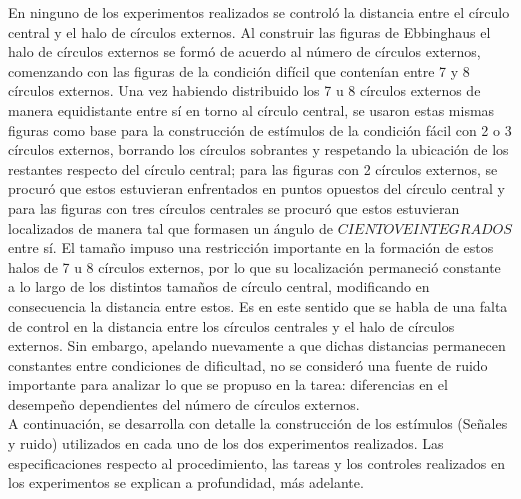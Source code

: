 En ninguno de los experimentos realizados se controló la distancia entre el círculo central y el halo de círculos externos. Al construir las figuras de Ebbinghaus el halo de círculos externos se formó de acuerdo al número de círculos externos, comenzando con las figuras de la condición difícil que contenían entre 7 y 8 círculos externos. Una vez habiendo distribuido los 7 u 8 círculos externos de manera equidistante entre sí en torno al círculo central, se usaron estas mismas figuras como base para la construcción de estímulos de la condición fácil con 2 o 3 círculos externos, borrando los círculos sobrantes y respetando la ubicación de los restantes respecto del círculo central; para las figuras con 2 círculos externos, se procuró que estos estuvieran enfrentados en puntos opuestos del círculo central y para las figuras con tres círculos centrales se procuró que estos estuvieran localizados de manera tal que formasen un ángulo de $CIENTO VEINTE GRADOS$ entre sí. El tamaño impuso una restricción importante en la formación de estos halos de 7 u 8 círculos externos, por lo que su localización permaneció constante a lo largo de los distintos tamaños de círculo central, modificando en consecuencia la distancia entre estos. Es en este sentido que se habla de una falta de control en la distancia entre los círculos centrales y el halo de círculos externos. Sin embargo, apelando nuevamente a que dichas distancias permanecen constantes entre condiciones de dificultad, no se consideró una fuente de ruido importante para analizar lo que se propuso en la tarea: diferencias en el desempeño dependientes del número de círculos externos.\\

A continuación, se desarrolla con detalle la construcción de los estímulos (Señales y ruido) utilizados en cada uno de los dos experimentos realizados. Las especificaciones respecto al procedimiento, las tareas y los controles realizados en los experimentos se explican a profundidad, más adelante.\\

